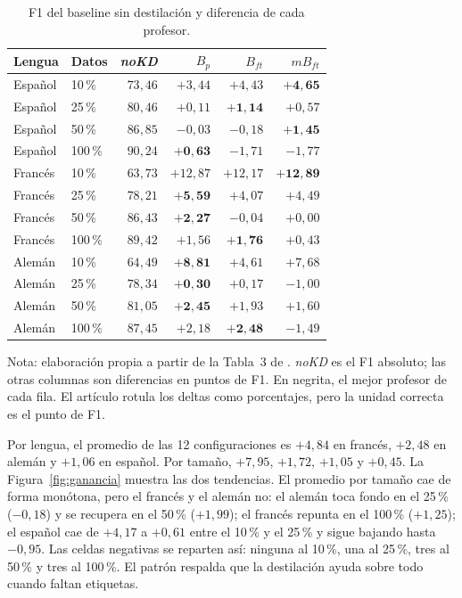 \begin{table}[H]
\centering
\caption{F1 del baseline sin destilación y diferencia de cada profesor.}
\label{tab:f1}
\small
\setlength{\tabcolsep}{4pt}
\begin{tabular}{@{}llrrrr@{}}
\toprule
Lengua & Datos & \textit{noKD} & $B_p$ & $B_{ft}$ & $mB_{ft}$ \\
\midrule
Español & 10\,\%  & $73{,}46$ & $+3{,}44$ & $+4{,}43$ & $\mathbf{+4{,}65}$ \\
Español & 25\,\%  & $80{,}46$ & $+0{,}11$ & $\mathbf{+1{,}14}$ & $+0{,}57$ \\
Español & 50\,\%  & $86{,}85$ & $-0{,}03$ & $-0{,}18$ & $\mathbf{+1{,}45}$ \\
Español & 100\,\% & $90{,}24$ & $\mathbf{+0{,}63}$ & $-1{,}71$ & $-1{,}77$ \\
\midrule
Francés & 10\,\%  & $63{,}73$ & $+12{,}87$ & $+12{,}17$ & $\mathbf{+12{,}89}$ \\
Francés & 25\,\%  & $78{,}21$ & $\mathbf{+5{,}59}$ & $+4{,}07$ & $+4{,}49$ \\
Francés & 50\,\%  & $86{,}43$ & $\mathbf{+2{,}27}$ & $-0{,}04$ & $+0{,}00$ \\
Francés & 100\,\% & $89{,}42$ & $+1{,}56$ & $\mathbf{+1{,}76}$ & $+0{,}43$ \\
\midrule
Alemán & 10\,\%  & $64{,}49$ & $\mathbf{+8{,}81}$ & $+4{,}61$ & $+7{,}68$ \\
Alemán & 25\,\%  & $78{,}34$ & $\mathbf{+0{,}30}$ & $+0{,}17$ & $-1{,}00$ \\
Alemán & 50\,\%  & $81{,}05$ & $\mathbf{+2{,}45}$ & $+1{,}93$ & $+1{,}60$ \\
Alemán & 100\,\% & $87{,}45$ & $+2{,}18$ & $\mathbf{+2{,}48}$ & $-1{,}49$ \\
\bottomrule
\end{tabular}

\vspace{4pt}
{\footnotesize Nota: elaboración propia a partir de la Tabla~3 de \cite{piperno2025}. \textit{noKD} es el F1 absoluto; las otras columnas son diferencias en puntos de F1. En negrita, el mejor profesor de cada fila. El artículo rotula los deltas como porcentajes, pero la unidad correcta es el punto de F1.}
\end{table}

Por lengua, el promedio de las 12 configuraciones es $+4{,}84$ en francés, $+2{,}48$ en alemán y $+1{,}06$ en español. Por tamaño, $+7{,}95$, $+1{,}72$, $+1{,}05$ y $+0{,}45$. La Figura~\ref{fig:ganancia} muestra las dos tendencias. El promedio por tamaño cae de forma monótona, pero el francés y el alemán no: el alemán toca fondo en el 25\,\% ($-0{,}18$) y se recupera en el 50\,\% ($+1{,}99$); el francés repunta en el 100\,\% ($+1{,}25$); el español cae de $+4{,}17$ a $+0{,}61$ entre el 10\,\% y el 25\,\% y sigue bajando hasta $-0{,}95$. Las celdas negativas se reparten así: ninguna al 10\,\%, una al 25\,\%, tres al 50\,\% y tres al 100\,\%. El patrón respalda que la destilación ayuda sobre todo cuando faltan etiquetas.

